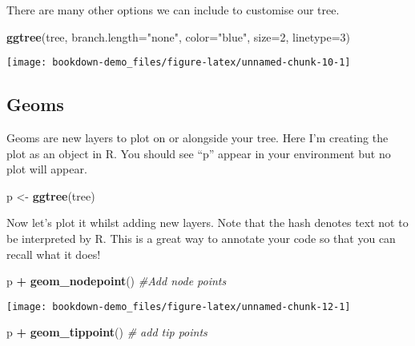 \documentclass[]{book}
\newenvironment{Shaded}{\begin{snugshade}}{\end{snugshade}}
\newcommand{\KeywordTok}[1]{\textcolor[rgb]{0.13,0.29,0.53}{\textbf{#1}}}
\newcommand{\DataTypeTok}[1]{\textcolor[rgb]{0.13,0.29,0.53}{#1}}
\newcommand{\DecValTok}[1]{\textcolor[rgb]{0.00,0.00,0.81}{#1}}
\newcommand{\StringTok}[1]{\textcolor[rgb]{0.31,0.60,0.02}{#1}}
\newcommand{\CommentTok}[1]{\textcolor[rgb]{0.56,0.35,0.01}{\textit{#1}}}
\newcommand{\OperatorTok}[1]{\textcolor[rgb]{0.81,0.36,0.00}{\textbf{#1}}}
\newcommand{\NormalTok}[1]{#1}
\begin{document}
There are many other options we can include to customise our tree.

\begin{Shaded}
\begin{Highlighting}[]
\KeywordTok{ggtree}\NormalTok{(tree, }
       \DataTypeTok{branch.length=}\StringTok{"none"}\NormalTok{, }
       \DataTypeTok{color=}\StringTok{"blue"}\NormalTok{, }
       \DataTypeTok{size=}\DecValTok{2}\NormalTok{, }
       \DataTypeTok{linetype=}\DecValTok{3}\NormalTok{)}
\end{Highlighting}
\end{Shaded}

\begin{center}\texttt{[image: bookdown-demo\_files/figure-latex/unnamed-chunk-10-1]} \end{center}

\subsection{Geoms}\label{geoms}

Geoms are new layers to plot on or alongside your tree. Here I'm
creating the plot as an object in R. You should see ``p'' appear in your
environment but no plot will appear.

\begin{Shaded}
\begin{Highlighting}[]
\NormalTok{p <-}\StringTok{ }\KeywordTok{ggtree}\NormalTok{(tree)}
\end{Highlighting}
\end{Shaded}

Now let's plot it whilst adding new layers. Note that the hash denotes
text not to be interpreted by R. This is a great way to annotate your
code so that you can recall what it does!

\begin{Shaded}
\begin{Highlighting}[]
\NormalTok{p }\OperatorTok{+}\StringTok{ }\KeywordTok{geom_nodepoint}\NormalTok{() }\CommentTok{#Add node points}
\end{Highlighting}
\end{Shaded}

\begin{center}\texttt{[image: bookdown-demo\_files/figure-latex/unnamed-chunk-12-1]} \end{center}

\begin{Shaded}
\begin{Highlighting}[]
\NormalTok{p }\OperatorTok{+}\StringTok{ }\KeywordTok{geom_tippoint}\NormalTok{() }\CommentTok{# add tip points}
\end{Highlighting}
\end{Shaded}
\end{document}
